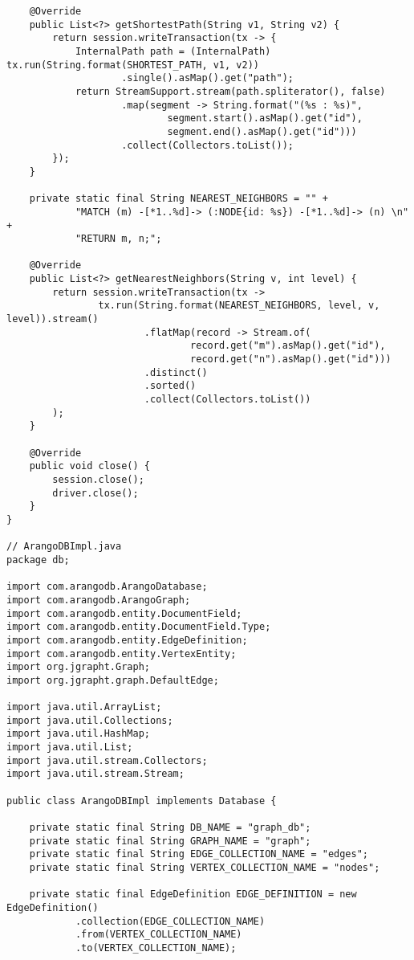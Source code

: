 \begin{lstlisting}
    @Override
    public List<?> getShortestPath(String v1, String v2) {
        return session.writeTransaction(tx -> {
            InternalPath path = (InternalPath) tx.run(String.format(SHORTEST_PATH, v1, v2))
                    .single().asMap().get("path");
            return StreamSupport.stream(path.spliterator(), false)
                    .map(segment -> String.format("(%s : %s)",
                            segment.start().asMap().get("id"),
                            segment.end().asMap().get("id")))
                    .collect(Collectors.toList());
        });
    }

    private static final String NEAREST_NEIGHBORS = "" +
            "MATCH (m) -[*1..%d]-> (:NODE{id: %s}) -[*1..%d]-> (n) \n" +
            "RETURN m, n;";

    @Override
    public List<?> getNearestNeighbors(String v, int level) {
        return session.writeTransaction(tx ->
                tx.run(String.format(NEAREST_NEIGHBORS, level, v, level)).stream()
                        .flatMap(record -> Stream.of(
                                record.get("m").asMap().get("id"),
                                record.get("n").asMap().get("id")))
                        .distinct()
                        .sorted()
                        .collect(Collectors.toList())
        );
    }

    @Override
    public void close() {
        session.close();
        driver.close();
    }
}

// ArangoDBImpl.java
package db;

import com.arangodb.ArangoDatabase;
import com.arangodb.ArangoGraph;
import com.arangodb.entity.DocumentField;
import com.arangodb.entity.DocumentField.Type;
import com.arangodb.entity.EdgeDefinition;
import com.arangodb.entity.VertexEntity;
import org.jgrapht.Graph;
import org.jgrapht.graph.DefaultEdge;

import java.util.ArrayList;
import java.util.Collections;
import java.util.HashMap;
import java.util.List;
import java.util.stream.Collectors;
import java.util.stream.Stream;

public class ArangoDBImpl implements Database {

    private static final String DB_NAME = "graph_db";
    private static final String GRAPH_NAME = "graph";
    private static final String EDGE_COLLECTION_NAME = "edges";
    private static final String VERTEX_COLLECTION_NAME = "nodes";

    private static final EdgeDefinition EDGE_DEFINITION = new EdgeDefinition()
            .collection(EDGE_COLLECTION_NAME)
            .from(VERTEX_COLLECTION_NAME)
            .to(VERTEX_COLLECTION_NAME);


\end{lstlisting}
